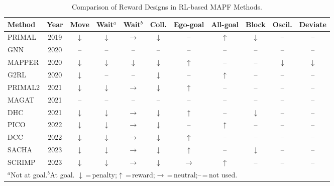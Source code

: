 \documentclass[sigconf]{acmart}
\begin{document}
\begin{table}[t]
\centering
\caption{Comparison of Reward Designs in RL-based MAPF Methods.}
\label{tab:reward_survey}
\renewcommand{\arraystretch}{1.1}
\setlength{\tabcolsep}{4pt}
\footnotesize
\begin{tabular}{lc cccc cc ccc}
\toprule
\textbf{Method} & \textbf{Year}
& \textbf{Move} & \textbf{Wait$^{a}$} & \textbf{Wait$^{b}$}
& \textbf{Coll.} & \textbf{Ego-goal} & \textbf{All-goal}
& \textbf{Block} & \textbf{Oscil.} & \textbf{Deviate} \\
\midrule
PRIMAL   & 2019 & $\downarrow$ & $\downarrow$ & $\rightarrow$ & $\downarrow$ & --             & $\uparrow$   & $\downarrow$ & --           & -- \\
GNN      & 2020 & --           & --           & --            & --           & --             & --           & --           & --           & -- \\
MAPPER   & 2020 & $\downarrow$ & $\downarrow$ & $\downarrow$  & $\downarrow$ & $\uparrow$     & --           & --           & $\downarrow$ & $\downarrow$ \\
G2RL     & 2020 & $\downarrow$ & --           & --            & $\downarrow$ & --             & $\uparrow$   & --           & --           & -- \\
PRIMAL2  & 2021 & $\downarrow$ & $\downarrow$ & $\rightarrow$ & $\downarrow$ & $\uparrow$     & --           & --           & --           & -- \\
MAGAT    & 2021 & --           & --           & --            & --           & --             & --           & --           & --           & -- \\
DHC      & 2021 & $\downarrow$ & $\downarrow$ & $\rightarrow$ & $\downarrow$ & $\uparrow$     & --           & $\downarrow$ & --           & -- \\
PICO     & 2022 & $\downarrow$ & $\downarrow$ & $\rightarrow$ & $\downarrow$ & --             & $\uparrow$   & --           & --           & -- \\
DCC      & 2022 & $\downarrow$ & $\downarrow$ & $\rightarrow$ & $\downarrow$ & $\uparrow$     & --           & --           & --           & -- \\
SACHA    & 2023 & $\downarrow$ & $\downarrow$ & $\rightarrow$ & $\downarrow$ & $\uparrow$     & --           & $\downarrow$ & --           & -- \\
SCRIMP   & 2023 & $\downarrow$ & $\downarrow$ & $\rightarrow$ & $\downarrow$ & $\rightarrow$  & $\uparrow$   & --           & --           & -- \\
\bottomrule
\multicolumn{11}{l}{\scriptsize $^{a}$Not at goal.\quad $^{b}$At goal.\quad
$\downarrow$\,=\,penalty;\;$\uparrow$\,=\,reward;\;$\rightarrow$\,=\,neutral;\;--\,=\,not used.}
\end{tabular}
\end{table}
\end{document}
